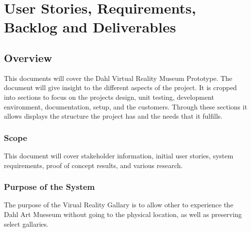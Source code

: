 \chapter{User Stories,  Requirements, Backlog and Deliverables}
\section{Overview}


This documents  will cover the Dahl Virtual Reality Museum Prototype. The document will give insight to the different aspects of the project. It is cropped into sections to focus on the projects design, unit testing, development environment, documentation, setup, and the customers. Through these sections it allows displays the structure the project has and the needs that it fulfills.






\subsection{Scope}


This document will cover stakeholder information, 
initial user stories, system requirements, proof of concept results, 
and various research. 



\subsection{Purpose of the System}
The purpose of the Virual Reality Gallary is to allow other to experience the Dahl Art
Mueseum without going to the physical location, as well as preserving select gallaries.  


